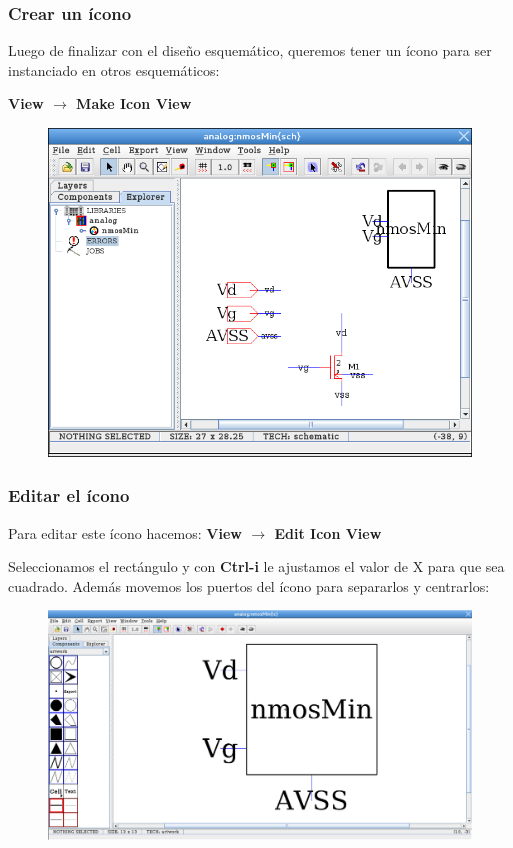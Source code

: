 \documentclass{beamer}
\begin{document}
\begin{frame}
\frametitle{Crear un ícono}
Luego de finalizar con el diseño esquemático, queremos tener un ícono para ser instanciado en otros esquemáticos:


\textbf{View $\rightarrow$ Make Icon View}

\begin{figure}
\includegraphics[width=0.8\linewidth]{figuras/edicionElectric-5.png} 
\end{figure}

\end{frame}
\begin{frame}
\frametitle{Editar el ícono}
Para editar este ícono hacemos:
\textbf{View $\rightarrow$ Edit Icon View}

Seleccionamos el rectángulo y con \textbf{Ctrl-i} le ajustamos el valor de X para que sea cuadrado. Además movemos los puertos del ícono para separarlos y centrarlos:

\begin{figure}
\includegraphics[width=0.99\linewidth]{figuras/edicionElectric-5b.png} 
\end{figure}

\end{frame}
\end{document}
